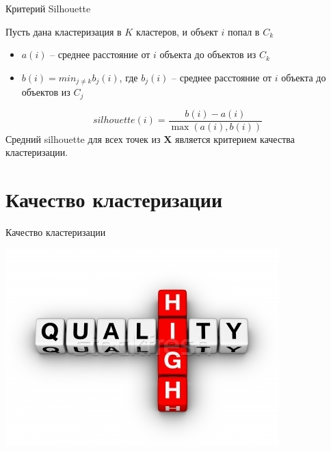 \documentclass[aspectratio=169]{beamer}
\begin{document}
\begin{frame}{Критерий Silhouette}

Пусть дана кластеризация в $K$ кластеров, и объект $i$ попал в $C_k$

\vspace{1em}
\begin{itemize}
\item $a(i)$ -- среднее расстояние от $i$ объекта до объектов из $C_k$
\item $b(i) = min_{j \neq k} b_j(i)$,  где $b_j(i)$ -- среднее расстояние от $i$ объекта до объектов из $C_j$
\end{itemize}
\[
silhouette(i) = \frac{b(i) - a(i)}{\max(a(i), b(i))}
\]
Средний silhouette для всех точек из $\mathbf{X}$ является критерием качества кластеризации.

\end{frame}


\section{Качество кластеризации}


\begin{frame}

\begin{center}
{\Large Качество кластеризации}

\includegraphics[scale=0.3]{images/quality.jpg}
\end{center}

\end{frame}
\end{document}
